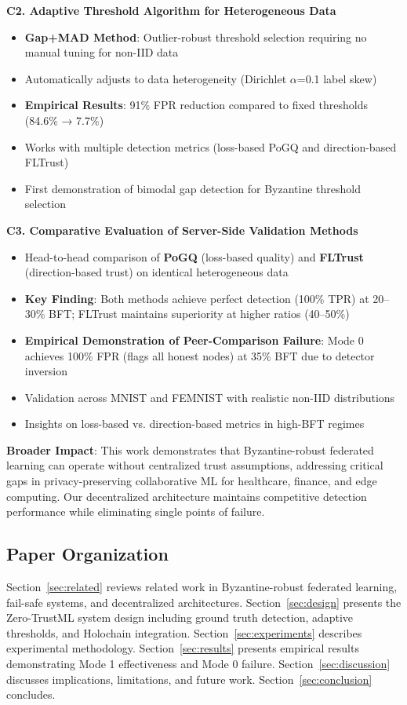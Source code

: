 \textbf{C2. Adaptive Threshold Algorithm for Heterogeneous Data}

\begin{itemize}
    \item \textbf{Gap+MAD Method}: Outlier-robust threshold selection requiring no manual tuning for non-IID data
    \item Automatically adjusts to data heterogeneity (Dirichlet $\alpha$=0.1 label skew)
    \item \textbf{Empirical Results}: 91\% FPR reduction compared to fixed thresholds (84.6\% → 7.7\%)
    \item Works with multiple detection metrics (loss-based PoGQ and direction-based FLTrust)
    \item First demonstration of bimodal gap detection for Byzantine threshold selection
\end{itemize}

\textbf{C3. Comparative Evaluation of Server-Side Validation Methods}

\begin{itemize}
    \item Head-to-head comparison of \textbf{PoGQ} (loss-based quality) and \textbf{FLTrust} (direction-based trust) on identical heterogeneous data
    \item \textbf{Key Finding}: Both methods achieve perfect detection (100\% TPR) at 20--30\% BFT; FLTrust maintains superiority at higher ratios (40--50\%)
    \item \textbf{Empirical Demonstration of Peer-Comparison Failure}: Mode 0 achieves 100\% FPR (flags all honest nodes) at 35\% BFT due to detector inversion
    \item Validation across MNIST and FEMNIST with realistic non-IID distributions
    \item Insights on loss-based vs. direction-based metrics in high-BFT regimes
\end{itemize}

\textbf{Broader Impact}: This work demonstrates that Byzantine-robust federated learning can operate without centralized trust assumptions, addressing critical gaps in privacy-preserving collaborative ML for healthcare, finance, and edge computing. Our decentralized architecture maintains competitive detection performance while eliminating single points of failure.

\subsection{Paper Organization}

Section~\ref{sec:related} reviews related work in Byzantine-robust federated learning, fail-safe systems, and decentralized architectures. Section~\ref{sec:design} presents the Zero-TrustML system design including ground truth detection, adaptive thresholds, and Holochain integration. Section~\ref{sec:experiments} describes experimental methodology. Section~\ref{sec:results} presents empirical results demonstrating Mode 1 effectiveness and Mode 0 failure. Section~\ref{sec:discussion} discusses implications, limitations, and future work. Section~\ref{sec:conclusion} concludes.
